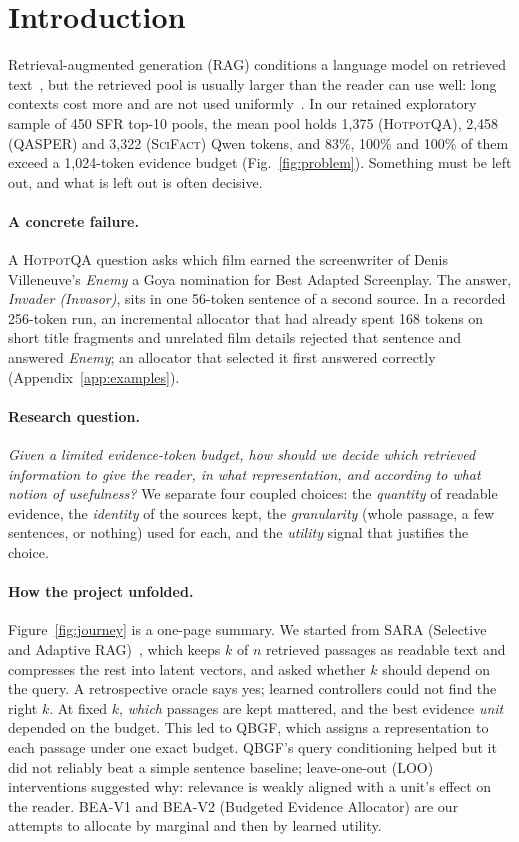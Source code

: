 \documentclass[10pt,twocolumn,letterpaper]{article}
\newcommand{\hotpot}{\textsc{HotpotQA}\xspace}
\newcommand{\qasper}{\textsc{QASPER}\xspace}
\newcommand{\scifact}{\textsc{SciFact}\xspace}
\begin{document}
\section{Introduction}\label{sec:intro}
Retrieval-augmented generation (RAG) conditions a language model on retrieved text~\cite{lewis2020rag}, but the retrieved pool is usually larger than the reader can use well: long contexts cost more and are not used uniformly~\cite{liu2024lost}. In our retained exploratory sample of 450 SFR top-10 pools, the mean pool holds 1,375 (\hotpot), 2,458 (\qasper) and 3,322 (\scifact) Qwen tokens, and 83\%, 100\% and 100\% of them exceed a 1,024-token evidence budget (Fig.~\ref{fig:problem}). Something must be left out, and what is left out is often decisive.

\paragraph{A concrete failure.} A \hotpot question asks which film earned the screenwriter of Denis Villeneuve's \emph{Enemy} a Goya nomination for Best Adapted Screenplay. The answer, \emph{Invader (Invasor)}, sits in one 56-token sentence of a second source. In a recorded 256-token run, an incremental allocator that had already spent 168 tokens on short title fragments and unrelated film details rejected that sentence and answered \emph{Enemy}; an allocator that selected it first answered correctly (Appendix~\ref{app:examples}).

\paragraph{Research question.} \emph{Given a limited evidence-token budget, how should we decide which retrieved information to give the reader, in what representation, and according to what notion of usefulness?} We separate four coupled choices: the \emph{quantity} of readable evidence, the \emph{identity} of the sources kept, the \emph{granularity} (whole passage, a few sentences, or nothing) used for each, and the \emph{utility} signal that justifies the choice.

\paragraph{How the project unfolded.} Figure~\ref{fig:journey} is a one-page summary. We started from SARA (Selective and Adaptive RAG)~\cite{jin2026sara}, which keeps $k$ of $n$ retrieved passages as readable text and compresses the rest into latent vectors, and asked whether $k$ should depend on the query. A retrospective oracle says yes; learned controllers could not find the right $k$. At fixed $k$, \emph{which} passages are kept mattered, and the best evidence \emph{unit} depended on the budget. This led to QBGF, which assigns a representation to each passage under one exact budget. QBGF's query conditioning helped but it did not reliably beat a simple sentence baseline; leave-one-out (LOO) interventions suggested why: relevance is weakly aligned with a unit's effect on the reader. BEA-V1 and BEA-V2 (Budgeted Evidence Allocator) are our attempts to allocate by marginal and then by learned utility.
\end{document}
